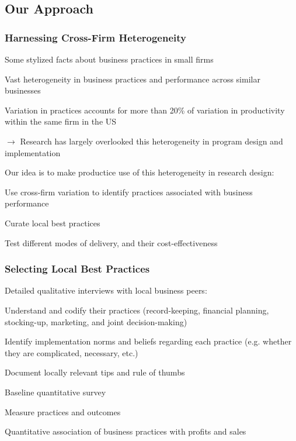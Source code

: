 \documentclass[hideothersubsections, usenames,dvipsnames,11pt]{beamer}
\newenvironment{itemize_3pt}{\itemize\addtolength{\itemsep}{3pt}}{\enditemize}
\begin{document}
\subsection{Our Approach}
\begin{frame}
\frametitle{Harnessing Cross-Firm Heterogeneity}
Some stylized facts about business practices in small firms
\begin{itemize_3pt}
	\item Vast heterogeneity in business practices and performance across similar businesses \citep{deMel2009}
	\item Variation in practices accounts for more than 20\% of variation in productivity within the same firm in the US \citep{Bloom2019}
	\item[] $\rightarrow$ Research has largely overlooked this heterogeneity in program design and implementation
\end{itemize_3pt}

\vspace{0.5em}
\pause

Our idea is to \textcolor{bdf}{make productice use of this heterogeneity} in research design: 
\begin{itemize_3pt}
	\item Use cross-firm variation to identify \textcolor{bdf}{practices associated with business performance}
	\item \textcolor{bdf}{Curate local best practices}
	\item Test different \textcolor{bdf}{modes of delivery}, and their cost-effectiveness
\end{itemize_3pt}

\end{frame}

\begin{frame}
\frametitle{Selecting Local Best Practices}
\begin{itemize_3pt}
\item Detailed \textcolor{bdf}{qualitative interviews} with local business peers:
    \begin{itemize_3pt}
    \item Understand and codify their practices (record-keeping, financial planning, stocking-up, marketing, and joint decision-making)
    \item Identify implementation norms and beliefs regarding each practice (e.g. whether they are complicated, necessary, etc.)
    \item Document locally relevant tips and rule of thumbs
    \end{itemize_3pt}
\vspace{0.1in}
\item Baseline \textcolor{bdf}{quantitative survey}
    \begin{itemize_3pt}
    \item Measure practices and outcomes
    \item Quantitative association of business practices with profits and sales
    \end{itemize_3pt}
\end{itemize_3pt}
\end{frame}
\end{document}
